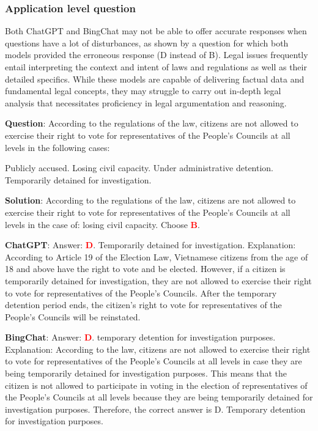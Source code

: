 \documentclass{article}
\begin{document}
{\begin{mdframed}[linewidth=1pt,linecolor=red]
		
	\end{mdframed}	
	
	\subsubsection{Application level question}
	
	\label{VNHSGE_Civ_A}
	
	Both ChatGPT and BingChat may not be able to offer accurate responses when questions have a lot of disturbances, as shown by a question for which both models provided the erroneous response (D instead of B). Legal issues frequently entail interpreting the context and intent of laws and regulations as well as their detailed specifics. While these models are capable of delivering factual data and fundamental legal concepts, they may struggle to carry out in-depth legal analysis that necessitates proficiency in legal argumentation and reasoning.
	
	
	
	\begin{mdframed}[linewidth=1pt,linecolor=red] \textbf{Question}: According to the regulations of the law, citizens are not allowed to exercise their right to vote for representatives of the People's Councils at all levels in the following cases: 
		
		\begin{choices}
			\choice Publicly accused.
			\choice Losing civil capacity.
			\choice Under administrative detention.
			\choice Temporarily detained for investigation.
		\end{choices}
		
		\textbf{Solution}: According to the regulations of the law, citizens are not allowed to exercise their right to vote for representatives of the People's Councils at all levels in the case of: losing civil capacity. Choose \textcolor{red}{\textbf{B}}.
		
		\textbf{ChatGPT}: Answer: \textcolor{red}{\textbf{D}}. Temporarily detained for investigation. Explanation: According to Article 19 of the Election Law, Vietnamese citizens from the age of 18 and above have the right to vote and be elected. However, if a citizen is temporarily detained for investigation, they are not allowed to exercise their right to vote for representatives of the People's Councils. After the temporary detention period ends, the citizen's right to vote for representatives of the People's Councils will be reinstated.
		
		\textbf{BingChat}: Answer: \textcolor{red}{\textbf{D}}. temporary detention for investigation purposes. Explanation: According to the law, citizens are not allowed to exercise their right to vote for representatives of the People’s Councils at all levels in case they are being temporarily detained for investigation purposes. This means that the citizen is not allowed to participate in voting in the election of representatives of the People’s Councils at all levels because they are being temporarily detained for investigation purposes. Therefore, the correct answer is D. Temporary detention for investigation purposes.
		

\end{mdframed}}
\end{document}
